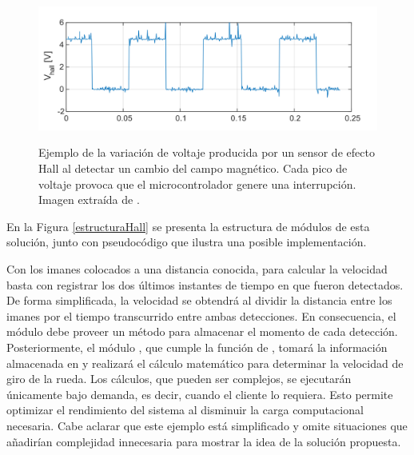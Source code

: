 \begin{figure}[H]
    
    \caption{Ejemplo de la variación de voltaje producida por un sensor de efecto Hall al detectar un cambio del campo magnético. Cada pico de voltaje provoca que el microcontrolador genere una interrupción. Imagen extraída de \cite{disenioViejo2}.}
    \centering
    \includegraphics[width=0.8\linewidth]{sensorHall.png}
    \label{hall}
\end{figure}


En la Figura \ref{estructuraHall} se presenta la estructura de módulos de esta solución, junto con pseudocódigo que ilustra una posible implementación.

Con los imanes colocados a una distancia conocida, para calcular la velocidad basta con registrar los dos últimos instantes de tiempo en que fueron detectados. De forma simplificada, la velocidad se obtendrá al dividir la distancia entre los imanes por el tiempo transcurrido entre ambas detecciones. En consecuencia, el módulo \Colector debe proveer un método para almacenar el momento de cada detección. Posteriormente, el módulo \SensorVelocidad, que cumple la función de \Computador, tomará la información almacenada en \Colector y realizará el cálculo matemático para determinar la velocidad de giro de la rueda. Los cálculos, que pueden ser complejos, se ejecutarán únicamente bajo demanda, es decir, cuando el cliente lo requiera. Esto permite optimizar el rendimiento del sistema al disminuir la carga computacional necesaria. Cabe aclarar que este ejemplo está simplificado y omite situaciones que añadirían complejidad innecesaria para mostrar la idea de la solución propuesta.

